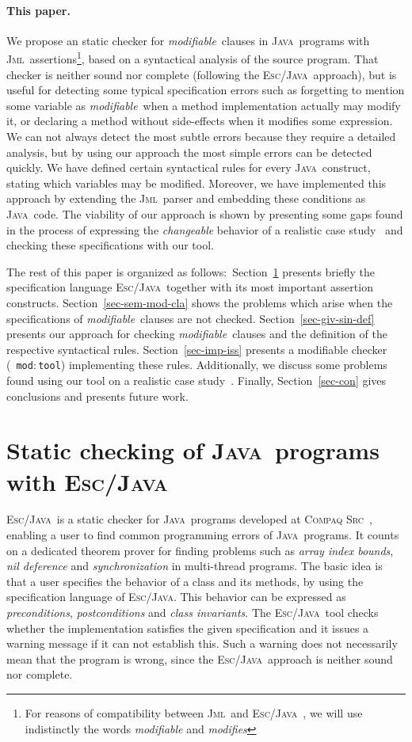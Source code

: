 \documentclass[a4paper]{llncs}
\newcommand{\jml}{\textsc{Jml}}
\newcommand{\escj}{\textsc{Esc/Java}}
\newcommand{\java}{\textsc{Java}}
\newcommand{\csrc}{\textsc{Compaq Src}}
\newcommand{\modtool}{\texttt{mod$:$tool}}
\newcommand{\modif}{\textit{modifiable}}
\begin{document}
\paragraph{\bf This paper.}We propose an static checker for
\modif~clauses in \java~programs with \jml~assertions\footnote{For
reasons of compatibility between \jml~and \escj~, we will 
use indistinctly the words \emph{modifiable} and \emph{modifies}},
based on a syntactical analysis of the source program. That
checker is neither sound nor complete (following the \escj~approach),
but is useful
for detecting some typical specification errors such as
forgetting to mention some variable
as \modif~when a method implementation actually may modify it, or
declaring a method without side-effects when it modifies some
expression. We can not always detect the most subtle errors because they 
require a detailed analysis, but by using our approach the most
simple errors can be detected quickly. We have defined certain
syntactical rules for every \java~construct, stating which
variables may be modified. Moreover, we have implemented
this approach by extending the \jml~parser and embedding these
conditions as \java~code. The viability of our approach is
shown by presenting some gaps found in the process of expressing the
\emph{changeable} behavior of a realistic case study~\cite{CH02} and
checking these specifications with our tool.


The rest of this paper is organized as follows$:$
Section~\ref{sec-esc-prg} presents briefly the specification language
\escj~together with its most important assertion
constructs. Section~\ref{sec-sem-mod-cla} shows the problems which
arise when the specifications of \modif~clauses are not
checked. Section~\ref{sec-giv-sin-def}
presents our approach for checking \modif~clauses and the definition
of the respective syntactical rules. Section~\ref{sec-imp-iss}
presents a modifiable checker (~\modtool) implementing these
rules. Additionally, we discuss some problems found using our tool on a
realistic case study~\cite{CH02}.
Finally, Section~\ref{sec-con}
gives conclusions and presents future work. 






\section{Static checking of \java~programs with \escj}
\label{sec-esc-prg}
\escj~is a static checker for \java~programs developed
at \csrc~\cite{ESC}, enabling a user to find common programming
errors of \java~programs. It counts on a dedicated theorem prover for
finding problems such as \emph{array index bounds},
\emph{nil deference} and \emph{synchronization} in multi-thread
programs. The basic idea is that
a user specifies the behavior of a class and its methods, by
using the specification language of \escj. This
behavior can be expressed as \textit{preconditions},
\textit{postconditions} and \textit{class invariants}. The \escj~tool
checks whether the implementation satisfies the given
specification and it issues a warning 
message if it can not establish this. Such a
warning does not necessarily mean that the program is
wrong, since the \escj~approach is neither sound nor
complete. 
\end{document}
